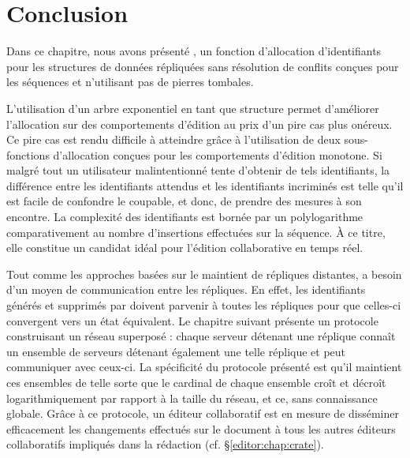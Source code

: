 
\section{Conclusion}
\label{repl:sec:conclusion}

Dans ce chapitre, nous avons présenté \LSEQ, un fonction d'allocation
d'identifiants pour les structures de données répliquées sans résolution de
conflits conçues pour les séquences et n'utilisant pas de pierres tombales.

L'utilisation d'un arbre exponentiel en tant que structure permet d'améliorer
l'allocation sur des comportements d'édition au prix d'un pire cas plus
onéreux. Ce pire cas est rendu difficile à atteindre grâce à l'utilisation de
deux sous-fonctions d'allocation conçues pour les comportements d'édition
monotone. Si malgré tout un utilisateur malintentionné tente d'obtenir de tels
identifiants, la différence entre les identifiants attendus et les identifiants
incriminés est telle qu'il est facile de confondre le coupable, et donc, de
prendre des mesures à son encontre. La complexité des identifiants \LSEQ est
bornée par un polylogarithme comparativement au nombre d'insertions effectuées
sur la séquence. À ce titre, elle constitue un candidat idéal pour l'édition
collaborative en temps réel.

Tout comme les approches basées sur le maintient de répliques distantes, \LSEQ a
besoin d'un moyen de communication entre les répliques. En effet, les
identifiants générés et supprimés par \LSEQ doivent parvenir à toutes les
répliques pour que celles-ci convergent vers un état équivalent.  Le chapitre
suivant présente un protocole construisant un réseau superposé : chaque serveur
détenant une réplique connaît un ensemble de serveurs détenant également une
telle réplique et peut communiquer avec ceux-ci. La spécificité du protocole
présenté est qu'il maintient ces ensembles de telle sorte que le cardinal de
chaque ensemble croît et décroît logarithmiquement par rapport à la taille du
réseau, et ce, sans connaissance globale. Grâce à ce protocole, un éditeur
collaboratif est en mesure de disséminer efficacement les changements effectués
sur le document à tous les autres éditeurs collaboratifs impliqués dans la
rédaction (cf. §\ref{editor:chap:crate}).


